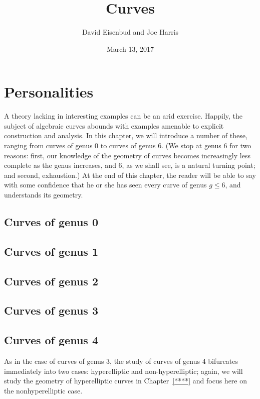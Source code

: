 \documentclass[12pt, leqno]{article}
\date{March 13, 2017}
\title{Curves}
\author{David Eisenbud and Joe Harris }
\begin{document}
\maketitle

\setlength{\parskip}{5pt}



\section{Personalities}

A theory lacking in interesting examples can be an arid exercise. Happily, the subject of algebraic curves abounds with examples amenable to explicit construction and analysis. In this chapter, we will introduce a number of these, ranging from curves of genus 0 to curves of genus 6. (We stop at genus 6 for two reasons: first, our knowledge of the geometry of curves becomes increasingly less complete as the genus increases, and 6, as we shall see, is a natural turning point; and second, exhaustion.) At the end of this chapter, the reader will be able to say with some confidence that he or she has seen every curve of genus $g \leq 6$, and understands its geometry.

\subsection{Curves of genus 0}

\subsection{Curves of genus 1}

\subsection{Curves of genus 2}

\subsection{Curves of genus 3}

\subsection{Curves of genus 4}

As in the case of curves of genus 3, the study of curves of genus 4 bifurcates immediately into two cases: hyperelliptic and non-hyperelliptic; again, we will study the geometry of hyperelliptic curves in Chapter~\ref{****} and focus here on the nonhyperelliptic case.
\end{document}

